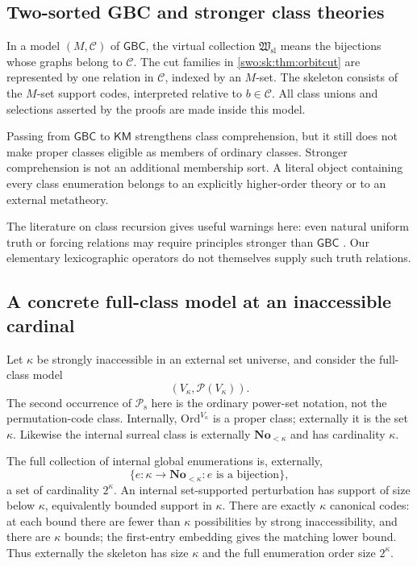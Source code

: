 \documentclass[11pt]{article}
\theoremstyle{definition}
\theoremstyle{remark}
\newcommand{\No}{\mathbf{No}}
\newcommand{\Ord}{\mathrm{Ord}}
\newcommand{\Hsl}{\mathfrak W_{\mathrm{sl}}}
\newcommand{\Psupp}{\mathcal P_{\mathrm{s}}}
\newcommand{\GBC}{\mathsf{GBC}}
\newcommand{\KM}{\mathsf{KM}}
\begin{document}
\subsection{Two-sorted GBC and stronger class theories}

In a model $(M,\mathcal C)$ of $\GBC$, the virtual collection $\Hsl$
means the bijections whose graphs belong to $\mathcal C$. The cut
families in \cref{swo:sk:thm:orbitcut} are represented by one relation in
$\mathcal C$, indexed by an $M$-set. The skeleton consists of the
$M$-set support codes, interpreted relative to $b\in\mathcal C$.
All class unions and selections asserted by the proofs are made inside
this model.

Passing from $\GBC$ to $\KM$ strengthens class comprehension, but it
still does not make proper classes eligible as members of ordinary
classes. Stronger comprehension is not an additional membership sort.
A literal object containing every class enumeration belongs to an
explicitly higher-order theory or to an external metatheory.

The literature on class recursion gives useful warnings here: even
natural uniform truth or forcing relations may require principles
stronger than $\GBC$ \cite{HamkinsOpenDet,HamkinsClassForcing}. Our elementary
lexicographic operators do not themselves supply such truth relations.

\subsection{A concrete full-class model at an inaccessible cardinal}

Let $\kappa$ be strongly inaccessible in an external set universe, and
consider the full-class model
\[
                          (V_\kappa,\mathcal P(V_\kappa)).
                                                               \tag{S08.12}\label{swo:sk:eq:t12}
\]
The second occurrence of $\Psupp$ here is the ordinary power-set
notation, not the permutation-code class. Internally,
$\Ord^{V_\kappa}$ is a proper class; externally it is the set
$\kappa$. Likewise the internal surreal class is externally
$\No_{<\kappa}$ and has cardinality $\kappa$.

The full collection of internal global enumerations is, externally,
\[
           \{e:\kappa\longrightarrow\No_{<\kappa}:e
                      \text{ is a bijection}\},                \tag{S08.13}\label{swo:sk:eq:t13}
\]
a set of cardinality $2^\kappa$. An internal set-supported perturbation
has support of size below $\kappa$, equivalently bounded support in
$\kappa$. There are exactly $\kappa$ canonical codes: at each bound
there are fewer than $\kappa$ possibilities by strong inaccessibility,
and there are $\kappa$ bounds; the first-entry embedding gives the
matching lower bound. Thus externally the skeleton has size $\kappa$
and the full enumeration order size $2^\kappa$.
\end{document}
